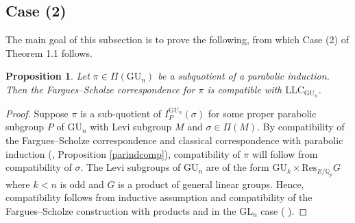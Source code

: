 \documentclass[reqno,11pt]{amsart}
\newtheorem{proposition}[theorem]{Proposition}
\theoremstyle{remark}
\newcommand{\GU}{\mathrm{GU}}
\newcommand{\Res}{\mathrm{Res}}
\newcommand{\GL}{\mathrm{GL}}
\newcommand{\Q}{\mathbb{Q}}
\newcommand{\LLC}{\mathrm{LLC}}
\begin{document}
\subsection{Case (2)}
The main goal of this subsection is to prove the following, from which Case (2) of Theorem 1.1 follows.


\begin{proposition}{\label{prop: case 2 compatibility}}
Let $\pi\in \Pi(\GU_n)$ be a subquotient of a parabolic induction. Then the Fargues--Scholze correspondence for $\pi$ is compatible with $\LLC_{\GU_n}$.
\end{proposition}
\begin{proof}
Suppose $\pi$ is a sub-quotient of $I^{\GU_n}_P(\sigma)$ for some proper parabolic subgroup $P$ of $\GU_n$ with Levi subgroup $M$ and $\sigma \in \Pi(M)$.  By compatibility of the Fargues--Scholze correspondence and classical correspondence with parabolic induction (\cite[Theorem~I.9.6 (viii)]{FS}, Proposition \ref{parindcomp}), compatibility of $\pi$ will follow from compatibility of $\sigma$. The Levi subgroups of $\GU_n$ are of the form $\GU_k \times \Res_{E/\Q_p} G$ where $k<n$ is odd and $G$ is a product of general linear groups. Hence, compatibility follows from inductive assumption and compatibility of the Fargues--Scholze construction with products and in the $\GL_n$ case ( \cite[Theorem~I.9.6 (vi), (ix)]{FS} ).
\end{proof}
\end{document}
